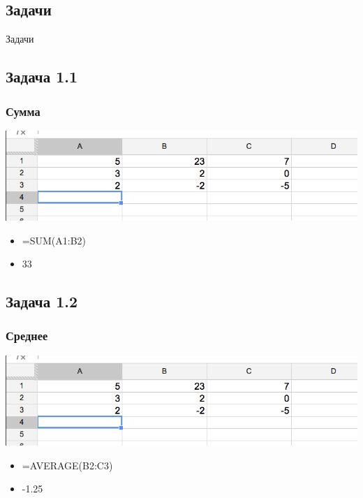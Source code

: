 \documentclass[compress,red]{beamer}
\begin{document}
\subsection{Задачи}
\begin{frame}
  \begin{center}
    \Huge{Задачи}
  \end{center}
\end{frame}


\subsection{Задача 1.1}
\begin{frame}[fragile]
  \frametitle{Сумма}
  \centerline{\includegraphics[width=1.0\textwidth]{images/11.png}}
  \begin{itemize}[<+->]
      \item =SUM(A1:B2)
      \item 33
  \end{itemize}
\end{frame}

\subsection{Задача 1.2}
\begin{frame}[fragile]
  \frametitle{Среднее}
  \centerline{\includegraphics[width=1.0\textwidth]{images/11.png}}
  \begin{itemize}[<+->]
      \item =AVERAGE(B2:C3)
      \item -1.25
  \end{itemize}
\end{frame}
\end{document}
